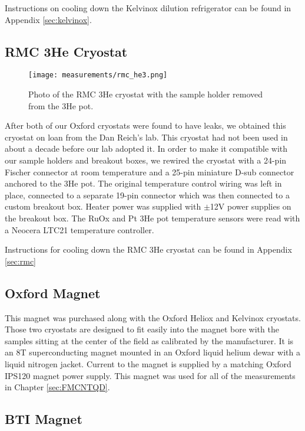 Instructions on cooling down the Kelvinox dilution refrigerator can be found in Appendix \ref{sec:kelvinox}.

\subsection{RMC 3He Cryostat}

\begin{figure}
    \centering
    \texttt{[image: measurements/rmc\_he3.png]}
    \caption{Photo of the RMC 3He cryostat with the sample holder removed from the 3He pot.}
    \label{fig:rmc}
\end{figure}

After both of our Oxford cryostats were found to have leaks, we obtained this cryostat on loan from the Dan Reich's lab. This cryostat had not been used in about a decade before our lab adopted it. In order to make it compatible with our sample holders and breakout boxes, we rewired the cryostat with a 24-pin Fischer connector at room temperature and a 25-pin miniature D-sub connector anchored to the 3He pot. The original temperature control wiring was left in place, connected to a separate 19-pin connector which was then connected to a custom breakout box. Heater power was supplied with $\pm$12V power supplies on the breakout box. The RuOx and Pt 3He pot temperature sensors were read with a Neocera LTC21 temperature controller.

Instructions for cooling down the RMC 3He cryostat can be found in Appendix \ref{sec:rmc}

\subsection{Oxford Magnet}

This magnet was purchased along with the Oxford Heliox and Kelvinox cryostats. Those two cryostats are designed to fit easily into the magnet bore with the samples sitting at the center of the field as calibrated by the manufacturer. It is an 8T superconducting magnet mounted in an Oxford liquid helium dewar with a liquid nitrogen jacket. Current to the magnet is supplied by a matching Oxford IPS120 magnet power supply. This magnet was used for all of the measurements in Chapter \ref{sec:FMCNTQD}.

\subsection{BTI Magnet}

